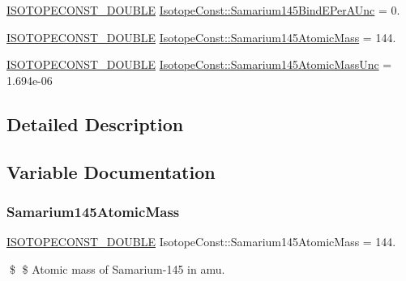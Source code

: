\begin{DoxyCompactItemize}
\mbox{\hyperlink{group___isotope_const-_macros_ga8f45a7272ce02c0b4c65c44636ed719a}{I\+S\+O\+T\+O\+P\+E\+C\+O\+N\+S\+T\+\_\+\+D\+O\+U\+B\+LE}} \mbox{\hyperlink{group___isotope_const-_samarium-_sm145_ga509e5a6d8c40615de4c7ec249bd11332}{Isotope\+Const\+::\+Samarium145\+Bind\+E\+Per\+A\+Unc}} = 0.
\item 
\mbox{\hyperlink{group___isotope_const-_macros_ga8f45a7272ce02c0b4c65c44636ed719a}{I\+S\+O\+T\+O\+P\+E\+C\+O\+N\+S\+T\+\_\+\+D\+O\+U\+B\+LE}} \mbox{\hyperlink{group___isotope_const-_samarium-_sm145_ga273c98d749e9f4f47626663730b55bb2}{Isotope\+Const\+::\+Samarium145\+Atomic\+Mass}} = 144.
\item 
\mbox{\hyperlink{group___isotope_const-_macros_ga8f45a7272ce02c0b4c65c44636ed719a}{I\+S\+O\+T\+O\+P\+E\+C\+O\+N\+S\+T\+\_\+\+D\+O\+U\+B\+LE}} \mbox{\hyperlink{group___isotope_const-_samarium-_sm145_ga01f94a932bf68f95a232fce9b241a053}{Isotope\+Const\+::\+Samarium145\+Atomic\+Mass\+Unc}} = 1.\+694e-\/06
\end{DoxyCompactItemize}


\subsection{Detailed Description}


\subsection{Variable Documentation}
\mbox{\label{group___isotope_const-_samarium-_sm145_ga273c98d749e9f4f47626663730b55bb2}} 
\subsubsection{\texorpdfstring{Samarium145\+Atomic\+Mass}{Samarium145AtomicMass}}
{\footnotesize\ttfamily \mbox{\hyperlink{group___isotope_const-_macros_ga8f45a7272ce02c0b4c65c44636ed719a}{I\+S\+O\+T\+O\+P\+E\+C\+O\+N\+S\+T\+\_\+\+D\+O\+U\+B\+LE}} Isotope\+Const\+::\+Samarium145\+Atomic\+Mass = 144.}

\$ \$ Atomic mass of Samarium-\/145 in amu. \mbox{\label{group___isotope_const-_samarium-_sm145_ga01f94a932bf68f95a232fce9b241a053}} 
